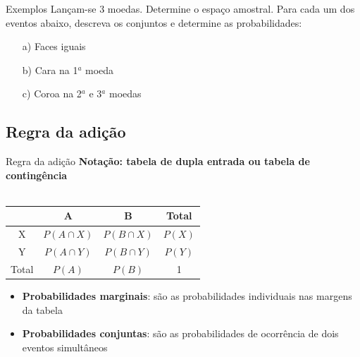 \documentclass[10pt]{beamer}\usepackage[]{graphicx}\usepackage[]{color}
\theoremstyle{definition}
\begin{document}
\begin{frame}[fragile]{Exemplos}
  Lançam-se 3 moedas. Determine o espaço amostral. Para cada um dos
  eventos abaixo, descreva os conjuntos e determine as probabilidades:
  \begin{itemize}
  \item[a)] Faces iguais
  \item[b)] Cara na 1$^a$ moeda
  \item[c)] Coroa na 2$^a$ e 3$^a$ moedas
  \end{itemize}
\end{frame}

\subsection{Regra da adição}

\begin{frame}[fragile]{Regra da adição}
  \textbf{Notação: tabela de dupla entrada ou tabela de contingência}\\~\\
  \begin{table}
    \centering
    \begin{tabular}{c|cc|c}
      \hline
      & A & B & Total \\
      \hline
      X & $P(A \cap X)$ & $P(B \cap X)$ & $P(X)$ \\
      Y & $P(A \cap Y)$ & $P(B \cap Y)$ & $P(Y)$ \\
      \hline
      Total & $P(A)$ & $P(B)$ & 1 \\
      \hline
    \end{tabular}
  \end{table}
  \begin{itemize}
  \item \textbf{Probabilidades marginais}: são as probabilidades
    individuais nas margens da tabela
  \item \textbf{Probabilidades conjuntas}: são as probabilidades de
    ocorrência de dois eventos simultâneos
  \end{itemize}
\end{frame}
\end{document}

